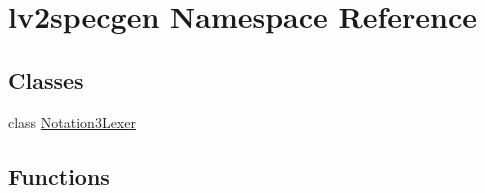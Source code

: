 \hypertarget{namespacelv2specgen}{}\section{lv2specgen Namespace Reference}
\label{namespacelv2specgen}
\subsection*{Classes}
\begin{DoxyCompactItemize}
\item 
class \hyperlink{classlv2specgen_1_1_notation3_lexer}{Notation3\+Lexer}
\end{DoxyCompactItemize}
\subsection*{Functions}
